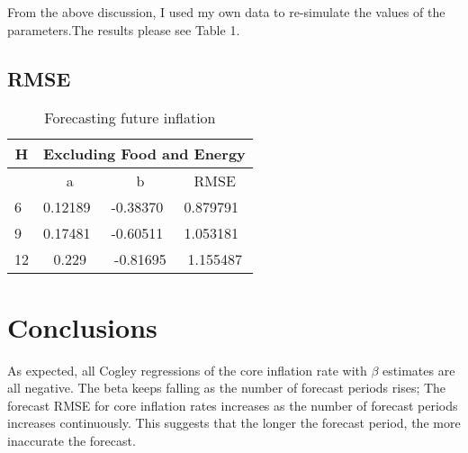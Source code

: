 \documentclass[
]{article}
\begin{document}
From the above discussion, I used my own data to re-simulate the values
of the parameters.The results please see Table 1.

\hypertarget{rmse}{%
\subsection{RMSE}\label{rmse}}

\begin{table}[h]
\centering
\caption{Forecasting future inflation}
\label{tab:my-table}
\begin{tabular}{|c|cll|}
\hline
H                       & \multicolumn{3}{c|}{Excluding Food and Energy}                                               \\ \hline
                        & \multicolumn{1}{c|}{a}       & \multicolumn{1}{c|}{b}        & \multicolumn{1}{c|}{RMSE}     \\ \hline
\multicolumn{1}{|l|}{6} & \multicolumn{1}{l|}{0.12189} & \multicolumn{1}{l|}{-0.38370} & 0.879791                      \\ \hline
\multicolumn{1}{|l|}{9} & \multicolumn{1}{l|}{0.17481} & \multicolumn{1}{l|}{-0.60511} & 1.053181                      \\ \hline
12                      & \multicolumn{1}{c|}{0.229}   & \multicolumn{1}{c|}{-0.81695} & \multicolumn{1}{c|}{1.155487} \\ \hline
\end{tabular}
\end{table}

\hypertarget{conclusions}{%
\section{Conclusions}\label{conclusions}}

As expected, all Cogley regressions of the core inflation rate with
\(\beta\) estimates are all negative. The beta keeps falling as the
number of forecast periods rises; The forecast RMSE for core inflation
rates increases as the number of forecast periods increases
continuously. This suggests that the longer the forecast period, the
more inaccurate the forecast.
\end{document}
